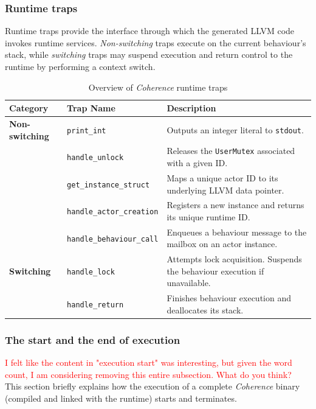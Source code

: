 \documentclass[a4paper,12pt,fleqn]{article}
\begin{document}
\subsubsection{Runtime traps}
Runtime traps provide the interface through which the generated LLVM code invokes runtime services. \textit{Non-switching} traps execute on the current behaviour's stack, while \textit{switching} traps may suspend execution and return control to the runtime by performing a context switch.
\begin{table}[H]
\centering
\small
\label{tab:runtime-traps}
\begin{tabular}{l l p{8cm}}
\toprule
\textbf{Category} & \textbf{Trap Name} & \textbf{Description} \\ \midrule
\textbf{Non-switching} & \texttt{print\_int} & Outputs an integer literal to \texttt{stdout}. \\ \addlinespace
& \texttt{handle\_unlock} & Releases the \texttt{UserMutex} associated with a given ID. \\ \addlinespace
& \texttt{get\_instance\_struct} & Maps a unique actor ID to its underlying LLVM data pointer. \\ \addlinespace
& \texttt{handle\_actor\_creation} & Registers a new instance and returns its unique runtime ID. \\ \addlinespace
& \texttt{handle\_behaviour\_call} & Enqueues a behaviour message to the mailbox on an actor instance. \\ \midrule
\textbf{Switching} & \texttt{handle\_lock} & Attempts lock acquisition. Suspends the behaviour execution if unavailable. \\ \addlinespace
& \texttt{handle\_return} & Finishes behaviour execution and deallocates its stack. \\ \bottomrule
\end{tabular}
\caption{Overview of \textit{Coherence} runtime traps}
\end{table}

\subsubsection{The start and the end of execution}
\textcolor{red}{I felt like the content in "execution start" was interesting, but given the word count, I am considering removing this entire subsection. What do you think?}\\
This section briefly explains how the execution of a complete \textit{Coherence} binary (compiled and linked with the runtime) starts and terminates.
\end{document}
